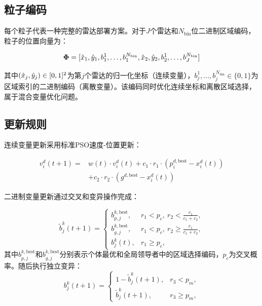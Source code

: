 \subsection{粒子编码}

每个粒子代表一种完整的雷达部署方案。对于$J$个雷达和$N_{\text{bin}}$位二进制区域编码，粒子的位置向量为：

\begin{equation}
\mathbf{\Phi} = [\hat{x}_1, \hat{y}_1, b_1^1, \ldots, b_1^{N_{\text{bin}}}, \hat{x}_2, \hat{y}_2, b_2^1, \ldots, b_J^{N_{\text{bin}}}]
\label{eq:particle_encoding}
\end{equation}

其中$(\hat{x}_j, \hat{y}_j) \in [0,1]^2$为第$j$个雷达的归一化坐标（连续变量），$b_j^1, \ldots, b_j^{N_{\text{bin}}} \in \{0,1\}$为区域索引的二进制编码（离散变量）。该编码同时优化连续坐标和离散区域选择，属于混合变量优化问题。

\subsection{更新规则}

连续变量更新采用标准PSO速度-位置更新：

\begin{equation}
\begin{aligned}
v_i^d(t+1) ={}& w(t) \cdot v_i^d(t)
 + c_1 \cdot r_1 \cdot \left(p_i^{d,\text{best}} - x_i^d(t)\right) \\
& + c_2 \cdot r_2 \cdot \left(g^{d,\text{best}} - x_i^d(t)\right)
\end{aligned}
\label{eq:continuous_update}
\end{equation}

二进制变量更新通过交叉和变异操作完成：

\begin{equation}
\tilde{b}_j^k(t+1) =
\begin{cases}
b_{p,j}^{k,\text{best}}, & r_1 < p_c,\ r_2 < \frac{c_1}{c_1+c_2}, \\
b_{g,j}^{k,\text{best}}, & r_1 < p_c,\ r_2 \geq \frac{c_1}{c_1+c_2}, \\
b_j^k(t), & r_1 \geq p_c,
\end{cases}
\label{eq:binary_crossover}
\end{equation}
其中$b_{p,j}^{k,\text{best}}$和$b_{g,j}^{k,\text{best}}$分别表示个体最优和全局领导者中的区域选择编码，$p_c$为交叉概率。随后执行独立变异：
\begin{equation}
b_j^k(t+1) =
\begin{cases}
1-\tilde{b}_j^k(t+1), & r_3 < p_m, \\
\tilde{b}_j^k(t+1), & r_3 \geq p_m,
\end{cases}
\label{eq:binary_mutation}
\end{equation}

